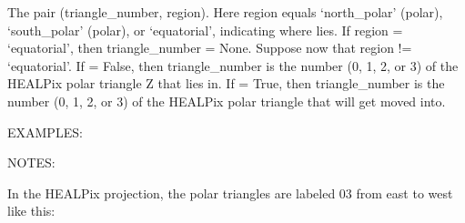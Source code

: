 \documentclass[a4paper,12ptopenany,oneside,english]{sphinxmanual}
\begin{document}
\begin{fulllineitems}
\sphinxAtStartPar
The pair (triangle\_number, region).
Here region equals ‘north\_polar’ (polar), ‘south\_polar’ (polar), or
‘equatorial’, indicating where  lies.
If region = ‘equatorial’, then triangle\_number = None.
Suppose now that region != ‘equatorial’.
If  = False, then triangle\_number is the number (0, 1, 2, or 3) of
the HEALPix polar triangle Z that  lies in.
If  = True, then triangle\_number is the number (0, 1, 2, or 3) of
the HEALPix polar triangle that  will get moved into.

\sphinxAtStartPar
EXAMPLES:

\begin{sphinxVerbatim}[commandchars=\\\{\}]
   
    
\end{sphinxVerbatim}

\sphinxAtStartPar
NOTES:

\sphinxAtStartPar
In the HEALPix projection, the polar triangles are labeled 0\textendash{}3 from
east to west like this:


\end{fulllineitems}
\end{document}
